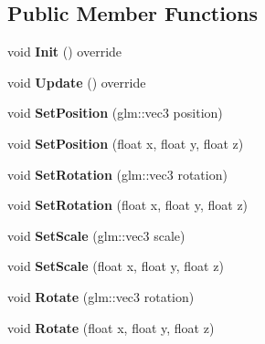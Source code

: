 \subsection*{Public Member Functions}
\begin{DoxyCompactItemize}
\item 
\mbox{\label{class_transform_aa7272732340e57fd963f060eb809baba}} 
void {\bfseries Init} () override
\item 
\mbox{\label{class_transform_a8e1207da9d197d6c3bfb401624dbc12f}} 
void {\bfseries Update} () override
\item 
\mbox{\label{class_transform_a88b34a1e029c06e06c2f4c3a1c516880}} 
void {\bfseries Set\+Position} (glm\+::vec3 position)
\item 
\mbox{\label{class_transform_a7c287f2ec371a1214df9fa7ad6a9718b}} 
void {\bfseries Set\+Position} (float x, float y, float z)
\item 
\mbox{\label{class_transform_a5a785270a1a2ea6b3dec27a831dcdfd5}} 
void {\bfseries Set\+Rotation} (glm\+::vec3 rotation)
\item 
\mbox{\label{class_transform_a80e28cb7ca8818e944c6177ed6ca7bfe}} 
void {\bfseries Set\+Rotation} (float x, float y, float z)
\item 
\mbox{\label{class_transform_a17725a6655e8da89b513de5b00ba077b}} 
void {\bfseries Set\+Scale} (glm\+::vec3 scale)
\item 
\mbox{\label{class_transform_a3f4051624bff3c6d6c5be9fd9433fe2f}} 
void {\bfseries Set\+Scale} (float x, float y, float z)
\item 
\mbox{\label{class_transform_af569380d0fec1c1a6640470313299a41}} 
void {\bfseries Rotate} (glm\+::vec3 rotation)
\item 
\mbox{\label{class_transform_a9dae613c62b5e62c510740d909dd1b2c}} 
void {\bfseries Rotate} (float x, float y, float z)
\item 
\mbox{\label{class_transform_abe980e3c01f1d20a93f4e35e5ef28e43}} 

\end{DoxyCompactItemize}

